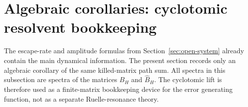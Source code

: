 
\section{Algebraic corollaries: cyclotomic resolvent bookkeeping}
\label{sec:resolvent}

The escape-rate and amplitude formulas from Section~\ref{sec:open-system}
already contain the main dynamical information.  The present section
records only an algebraic corollary of the same killed-matrix path
sum.  All spectra in this subsection are spectra of the matrices \(B_H\)
and \(\widehat B_H\).  The cyclotomic lift is therefore used as a
finite-matrix bookkeeping device for the error generating function, not
as a separate Ruelle-resonance theory.

